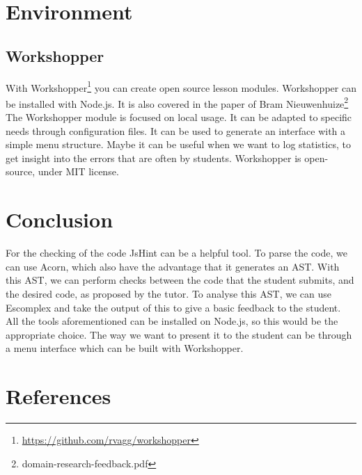 \documentclass{article}
\begin{document}
\section{Environment}
\subsection{Workshopper}
With Workshopper\footnote{\url{https://github.com/rvagg/workshopper}} you can create open source lesson modules.
Workshopper can be installed with Node.js.
It is also covered in the paper of Bram Nieuwenhuize\footnote{domain-research-feedback.pdf}
The Workshopper module is focused on local usage. It can be adapted to specific needs through configuration files.
It can be used to generate an interface with a simple menu structure.
Maybe it can be useful when we want to log statistics, to get insight into the errors that are often by students.
Workshopper is open-source, under MIT license.

\section{Conclusion}
For the checking of the code JsHint can be a helpful tool.
To parse the code, we can use Acorn, which also have the advantage that it generates an AST. 
With this AST, we can perform checks between the code that the student submits, and the desired code, as proposed by the tutor.
To analyse this AST, we can use Escomplex and take the output of this to give a basic feedback to the student.
All the tools aforementioned can be installed on Node.js, so this would be the appropriate choice. 
The way we want to present it to the student can be through a menu interface which can be built with Workshopper.

\section{References}
\end{document}
